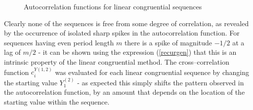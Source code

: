 \documentclass[dvips]{article}
\begin{document}
\begin{figure}[htbp]
\begin{center}
\quad
\label{figautolcg}
\caption{Autocorrelation functions for linear congruential sequences}
\end{center}
\end{figure}
Clearly none of the sequences is free from some degree of correlation,
as revealed by the occurrence of isolated sharp spikes in the
autocorrelation function.  For sequences having even period length $m$ there is a spike
of magnitude $-1/2$ at a lag of $m/2$ - it can be shown \cite{knuth} using the
expression (\ref{recurgen}) that this is an
intrinsic property of the linear congruential method.  The
cross--correlation function $c^{Y(1,2)}_{i}$ was evaluated for each
linear congruential sequence by changing the starting value $Y^{(2)}_{1}$
- as expected this simply shifts the pattern observed in the
autocorrelation function, by an amount that depends on the location
of the starting value within the sequence.
\end{document}
